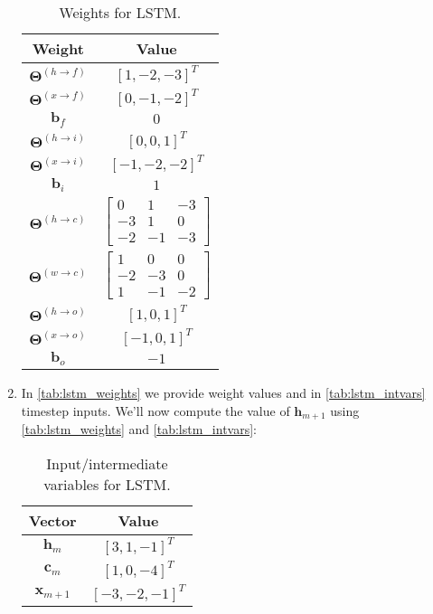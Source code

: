 \documentclass[12pt, letterpaper]{article}
\begin{document}
\begin{enumerate}

\begin{table}[h!]
    \centering
    \begin{tabular}{|cc|}
    \toprule
    \textbf{Weight} & \textbf{Value} \\
    \midrule
    $\boldsymbol{\Theta}^{(h\rightarrow f)}$ & $[1,-2,-3]^T$ \\
    $\boldsymbol{\Theta}^{(x\rightarrow f)}$ & $[0,-1,-2]^T$ \\
    $\boldsymbol{b}_f$ & $0$ \\
    $\boldsymbol{\Theta}^{(h\rightarrow i)}$ & $[0,0,1]^T$\\
    $\boldsymbol{\Theta}^{(x\rightarrow i)}$ & $[-1,-2,-2]^T$\\
    $\boldsymbol{b}_i$ & $1$ \\
    $\boldsymbol{\Theta}^{(h\rightarrow c)}$ & $\begin{bmatrix}
    0 & 1 & -3\\
    -3 & 1 & 0\\
    -2 & -1 & -3
        \end{bmatrix}$ \\
    $\boldsymbol{\Theta}^{(w\rightarrow c)}$ & $\begin{bmatrix}
    1 & 0 & 0 \\
    -2 & -3 & 0\\
    1 & -1 & -2 \end{bmatrix}$ \\
    $\boldsymbol{\Theta}^{(h\rightarrow o)}$ & $[1,0,1]^T$\\
    $\boldsymbol{\Theta}^{(x\rightarrow o)}$ & $[-1,0,1]^T$\\
    $\boldsymbol{b}_o$ & $-1$ \\
    \bottomrule
    \end{tabular}
    \caption{Weights for LSTM.}
    \label{tab:lstm_weights}
\end{table}

\item In \autoref{tab:lstm_weights} we provide weight values and in \autoref{tab:lstm_intvars} timestep inputs. We'll now compute the value of $\boldsymbol{h}_{m+1}$ using \autoref{tab:lstm_weights} and \autoref{tab:lstm_intvars}: 

\begin{table}[h!]
    \centering
    \begin{tabular}{|cc|}
    \toprule
    \textbf{Vector} & \textbf{Value} \\
    \midrule
    $\boldsymbol{h}_m$ & $[3,1,-1]^T$ \\
    $\boldsymbol{c}_m$ & $[1,0,-4]^T$ \\
    $\boldsymbol{x}_{m+1}$ & $[-3,-2,-1]^T$ \\
    \bottomrule
    \end{tabular}
    \caption{Input/intermediate variables for LSTM.}
    \label{tab:lstm_intvars}
\end{table}


\end{enumerate}
\end{document}

